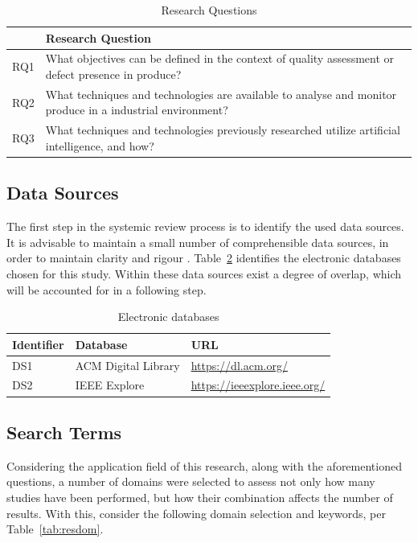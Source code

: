 \documentclass[conference]{IEEEtran}
\begin{document}
\begin{table}
    \caption{Research Questions}
    \label{tab:resquest}

    \begin{tabular}{ll}
    \hline
        & \textbf{Research Question} \\
    \hline
        RQ1 & What objectives can be defined in the context of quality assessment or defect presence in produce? \\
        RQ2 &  What techniques and technologies are available to analyse and monitor produce in a industrial environment?\\
        RQ3 & What techniques and technologies previously researched utilize artificial intelligence, and how? \\
    \hline
    \end{tabular}
\end{table}

\subsection{Data Sources}

The first step in the systemic review process is to identify the used data sources. It is advisable
to maintain a small number of comprehensible data sources, in order to maintain clarity and rigour \cite{Par2015}. Table~\ref{tab:edata} identifies the electronic databases chosen for this study. Within these data sources exist a degree of overlap, which will be accounted for in a following step.

\begin{table}
    \caption{Electronic databases}
    \label{tab:edata}

    \begin{tabular}{lll}
    \hline
        Identifier & Database & URL \\
    \hline
        DS1 & ACM Digital Library & \url{https://dl.acm.org/} \\
        DS2 & IEEE Explore & \url{https://ieeexplore.ieee.org/} \\
    \hline

    \hline
    \end{tabular}
\end{table}

\subsection{Search Terms}

Considering the application field of this research, along with the aforementioned questions, a number of domains were selected to assess not only how many studies have been performed, but how their combination affects the number of results. With this, consider the following domain selection and keywords, per Table~\ref{tab:resdom}.
\end{document}
